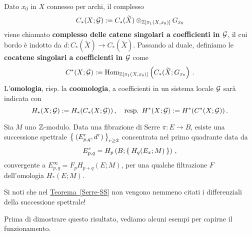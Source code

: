 \begin{df}
	Dato $x_{0}$ in $X$ connesso per archi, il complesso
	\begin{equation*}
		C_{*}(X;\mathcal{G}) := C_{*}(\widetilde{X}) \otimes_{{\mathbb Z}[\pi_{1}(X,x_{0})]} G_{x_{0}}
	\end{equation*}
	viene chiamato \textbf{complesso delle catene singolari a coefficienti in $\mathcal{G}$},
	il cui bordo è indotto da $d:C_{*}(\widetilde{X}) \to C_{*}(\widetilde{X})$.
	Passando al duale, definiamo le \textbf{cocatene singolari a coefficienti in $\mathcal{G}$}
	come
	\begin{equation*}
		C^{*}(X;\mathcal{G}) := \operatorname{Hom}_{{\mathbb Z}[\pi_{1}(X,x_{0})]}\left(C_{*}(\widetilde{X};G_{x_{0}}\right)\,.
	\end{equation*}
	L'\textbf{omologia}, risp. la \textbf{coomologia}, a coefficienti
	in un sistema locale $\mathcal{G}$ sarà indicata con
	\begin{equation*}
		H_{*}(X;\mathcal{G}) := H_{*}(C_{*}(X;\mathcal{G}))\,, \quad
		\text{resp. } H^{*}(X;\mathcal{G}) := H^{*}(C^{*}(X;\mathcal{G}))\,.
	\end{equation*}
\end{df}


\begin{thm}\label{Serre-SS}
	Sia $M$ uno ${\mathbb Z}$-modulo.	
	Data una fibrazione di Serre $\pi:E \to B$,
	esiste una successione spettrale $\Set{(E^{r}_{p,q},d^{r})}_{r \ge 2}$
	concentrata nel primo quadrante data da
	\begin{equation*}
		E_{p,q}^{r} = H_{p}\left(B; \Set{H_{q}(E_{x};M)}\right)\,,
	\end{equation*}
	convergente a $E^{\infty}_{p,q} = F_{p}H_{p+q}(E;M)$,
	per una qualche filtrazione $F$ dell'omologia 
	$H_{*}(E;M)$.
\end{thm}

\begin{oss}
	Si noti che nel \hyperref[Serre-SS]{Teorema~\ref{Serre-SS}}
	non vengono nemmeno citati i differenziali della successione spettrale!
\end{oss}

Prima di dimostrare questo risultato,
vediamo alcuni esempi per capirne il funzionamento.

